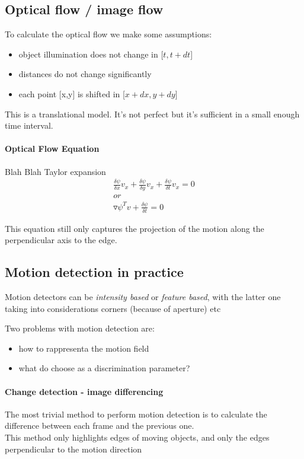 \documentclass{article}
\begin{document}
\subsection{Optical flow / image flow}
To calculate the optical flow we make some assumptions:
\begin{itemize}
    \item object illumination does not change in [$t, t+dt$]
    \item distances do not change significantly
    \item each point [x,y] is shifted in [$x+dx, y+dy$]
\end{itemize}

This is a translational model. It's not perfect but it's sufficient in a small enough time interval.

\paragraph{Optical Flow Equation} Blah Blah Taylor expansion
\begin{gather*}
    \frac{\delta\psi}{\delta x}v_x +
    \frac{\delta\psi}{\delta y}v_x +
    \frac{\delta\psi}{\delta t}v_x = 0
    \\ or \\
    \triangledown \psi^T v + \frac{\delta\psi}{\delta t} = 0
\end{gather*}

This equation still only captures the projection of the motion along the perpendicular axis to the edge.

\subsection{Motion detection in practice}
Motion detectors can be \textit{intensity based} or \textit{feature based}, with the latter one taking into considerations corners (because of aperture) etc

Two problems with motion detection are:
\begin{itemize}
    \item how to rappresenta the motion field
    \item what do choose as a discrimination parameter?
\end{itemize}

\paragraph{Change detection - image differencing}
The most trivial method to perform motion detection is to calculate the difference between each frame and the previous one.\\
This method only highlights edges of moving objects, and only the edges perpendicular to the motion direction
\end{document}
